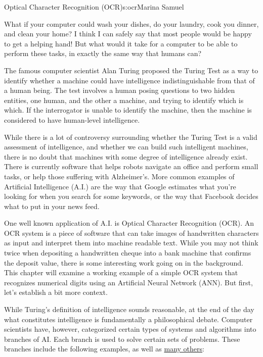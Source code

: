 \begin{aosachapter}{Optical Character Recognition (OCR)}{s:ocr}{Marina Samuel}

\label{introduction}

What if your computer could wash your dishes, do your laundry, cook you
dinner, and clean your home? I think I can safely say that most people
would be happy to get a helping hand! But what would it take for a
computer to be able to perform these tasks, in exactly the same way that
humans can?

The famous computer scientist Alan Turing proposed the Turing Test as a
way to identify whether a machine could have intelligence
indistinguishable from that of a human being. The test involves a human
posing questions to two hidden entities, one human, and the other a
machine, and trying to identify which is which. If the interrogator is
unable to identify the machine, then the machine is considered to have
human-level intelligence.

While there is a lot of controversy surrounding whether the Turing Test
is a valid assessment of intelligence, and whether we can build such
intelligent machines, there is no doubt that machines with some degree
of intelligence already exist. There is currently software that helps
robots navigate an office and perform small tasks, or help those
suffering with Alzheimer's. More common examples of Artificial
Intelligence (A.I.) are the way that Google estimates what you're
looking for when you search for some keywords, or the way that Facebook
decides what to put in your news feed.

One well known application of A.I. is Optical Character Recognition
(OCR). An OCR system is a piece of software that can take images of
handwritten characters as input and interpret them into machine readable
text. While you may not think twice when depositing a handwritten cheque
into a bank machine that confirms the deposit value, there is some
interesting work going on in the background. This chapter will examine a
working example of a simple OCR system that recognizes numerical digits
using an Artificial Neural Network (ANN). But first, let's establish a
bit more context.

\label{what-is-artificial-intelligence}

\label{sec.ocr.ai}

While Turing's definition of intelligence sounds reasonable, at the end
of the day what constitutes intelligence is fundamentally a
philosophical debate. Computer scientists have, however, categorized
certain types of systems and algorithms into branches of AI. Each branch
is used to solve certain sets of problems. These branches include the
following examples, as well as
\href{http://www-formal.stanford.edu/jmc/whatisai/node2.html}{many
others}:


\end{aosachapter}
